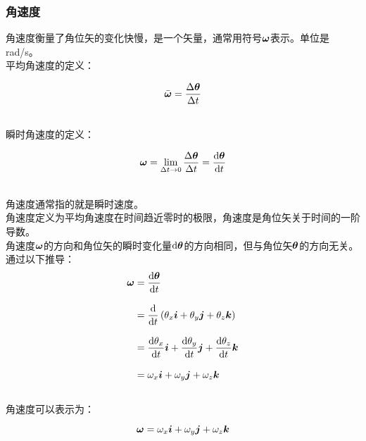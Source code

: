 \documentclass[UTF8]{ctexart}
\newcommand*{\veb}[1]{\vb*{#1}}
\newcommand*{\dif}{\mathop{}\!\mathrm{d}}
\begin{document}
\newpage

\subsubsection{角速度}
    角速度衡量了角位矢的变化快慢，是一个矢量，通常用符号$\veb{\omega}$表示。单位是\si{rad/s}。\\[3mm]
    平均角速度的定义：
    \begin{large}
        \begin{equation*}
            \bar{\veb{\omega}}=\frac{\Delta \veb{\theta}}{\Delta t}
        \end{equation*}
    \end{large}\\
    瞬时角速度的定义：
    \begin{large}
        \begin{equation*}
            \veb{\omega}=\lim_{\Delta t\rightarrow 0}\frac{\Delta \veb{\theta}}{\Delta t}=\frac{\dif\veb{\theta}}{\dif t}
        \end{equation*}
    \end{large}\\
    角速度通常指的就是瞬时速度。\\[3mm]
    角速度定义为平均角速度在时间趋近零时的极限，角速度是角位矢关于时间的一阶导数。\\[3mm]
    角速度$\veb{\omega}$的方向和角位矢的瞬时变化量$\dif\veb{\theta}$的方向相同，但与角位矢$\veb{\theta}$的方向无关。\\[6mm]
    通过以下推导：
    \setcounter{equation}{0}
    \begin{align}
        \veb{\omega}
        &=\frac{\dif\veb{\theta}}{\dif t}\\[3mm]
        &=\frac{\dif}{\dif t}\left(\theta_x\veb{i}+\theta_y\veb{j}+\theta_z\veb{k}\right)\\[3mm]
        &=\frac{\dif \theta_x}{\dif t}\veb{i}+\frac{\dif \theta_y}{\dif t}\veb{j}+\frac{\dif \theta_z}{\dif t}\veb{k}\\[3mm]
        &=\omega_x\veb{i}+\omega_y\veb{j}+\omega_z\veb{k}
    \end{align}\\
    角速度可以表示为：
    \begin{large}
        \begin{equation*}
            \veb{\omega}=\omega_x\veb{i}+\omega_y\veb{j}+\omega_z\veb{k}
        \end{equation*}
    \end{large}\\
\end{document}
